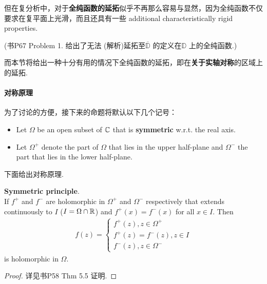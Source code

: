 	但在复分析中，对于\textbf{全纯函数的延拓}似乎不再那么容易与显然，因为全纯函数不仅要求在复平面上光滑，而且还具有一些 additional characteristically rigid properties. 
	\begin{center}
		(书P67 Problem 1. 给出了无法 (解析)延拓至$\overline{\mathbb{D}}$ 的定义在$\mathbb{D}$ 上的全纯函数.)
	\end{center}
	而本节将给出一种十分有用的情况下全纯函数的延拓，即在\textbf{关于实轴对称}的区域上的延拓.
	
\vspace{2em}
\paragraph{对称原理}
	为了讨论的方便，接下来的命题将默认以下几个记号：
	\begin{itemize}
		\item Let $\Omega$ be an open subset of $\mathbb{C}$ that is \textbf{symmetric} w.r.t. the real axis.
		
		\item Let $\Omega^{+}$ denote the part of $\Omega$ that lies in the upper half-plane and $\Omega^{-}$ the part that lies in the lower half-plane.
	\end{itemize}
	
	\vspace{2em}
	下面给出对称原理.
	\begin{thm}\label{thm 6.4.1}
		\textbf{Symmetric principle}. \\
		If $f^{+}$ and $f^{-}$ are holomorphic in $\Omega^{+}$ and $\Omega^{-}$ respectively that extends continuously to $I$ ($I = \Omega \cap \mathbb{R}$) and $f^{+}(x) = f^{-}(x)$ for all $x \in I$. Then
		\begin{align}
			f(z) = 
			\begin{cases}
				f^{+}(z) , z \in \Omega^{+} \\
				f^{+}(z) = f^{-}(z) , z \in I \\
				f^{-}(z) , z \in \Omega^{-}
			\end{cases}
		\end{align}
		is holomorphic in $\Omega$.
		
		\vspace{2em}
		\begin{proof}
			详见书P58 Thm 5.5 证明.
		\end{proof}
	\end{thm}

\newpage
